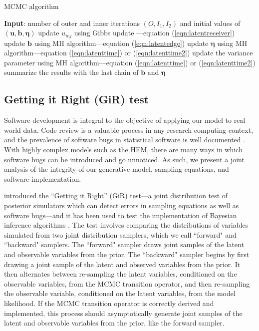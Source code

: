 \documentclass[ba]{imsart}
\def\spacingset#1{\renewcommand{\baselinestretch}%
	{#1}\small\normalsize} \spacingset{1}
\numberwithin{equation}{section}
\theoremstyle{plain}
\begin{document}
		\begin{algorithm}[!t]
			\spacingset{1}
			\SetAlgoLined
			\caption{MCMC algorithm}
			\begin{algorithmic}
				\STATE \textbf{Input}: number of outer and inner iterations $(O, I_1, I_2)$ and initial values of $(\boldsymbol{u}, \boldsymbol{b}, \boldsymbol{\eta})$
				\vskip 0.1in
				\STATE update $u_{iej}$ using Gibbs update ---equation (\ref{eqn:latentreceiver})
				\ENDFOR
				\ENDFOR
				\ENDFOR
				\STATE update $\boldsymbol{b}$ using MH algorithm---equation (\ref{eqn:latentedge})
				\ENDFOR
				\STATE update $\boldsymbol{\eta}$ using MH algorithm---equation (\ref{eqn:latenttime}) or (\ref{eqn:latenttime2}) 
				\ENDFOR
				\STATE update the variance parameter using MH algorithm---equation (\ref{eqn:latenttime}) or (\ref{eqn:latenttime2}) 
				\ENDIF
				\ENDFOR
				\STATE	summarize the results with the last chain of $\boldsymbol{b}$ and $\boldsymbol{\eta}$
			\end{algorithmic}
			\label{alg:MCMC}
		\end{algorithm}

	\subsection{Getting it Right (GiR) test} \label{subec:GiR}
	Software development is integral to the objective of applying our model to real world data. Code review is a valuable process in any research computing context, and the prevalence of software bugs in statistical software is well documented \citep[e.g., ][]{altman2004numerical,mccullough2009accuracy}.  With highly complex models such as the HEM, there are many ways in which software bugs can be introduced and go unnoticed. As such, we present a joint analysis of the integrity of our generative model, sampling equations, and software implementation. 
	
	\cite{geweke2004getting} introduced the ``Getting it Right'' (GiR) test---a joint distribution test of posterior simulators which can detect errors in sampling equations as well as software bugs---and it has been used to test the implementation of Bayesian inference algorithms \citep{zhao2016bayesian}.  The test involves comparing the distributions of variables simulated from two joint distribution samplers, which we call ``forward" and ``backward" samplers. The ``forward" sampler draws joint samples of the latent and observable variables from the prior. The ``backward" sampler begins by first drawing a joint sample of the latent and observed variables from the prior. It then alternates between re-sampling the latent variables, conditioned on the observable variables, from the MCMC transition operator, and then re-sampling the observable variable, conditioned on the latent variables, from the model likelihood. If the MCMC transition operator is correctly derived and implemented, this process should asymptotically generate joint samples of the latent and observable variables from the prior, like the forward sampler.
		
\end{document}
